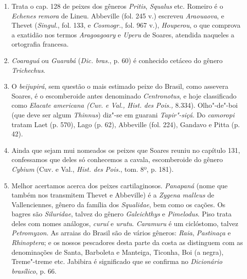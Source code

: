 \begin{enumerate}
\begin{verse}
\textit{Che sotto l'acqua è gente che sospira,\\ 
E fanno pullular quest'acqua al summo.} \\*
\end{verse}
As assaltadas de que se faz menção seriam talvez obra de tubarões ou de jacarés, uma 
vez que por ali não consta haver focas.

\item Trata o cap. 128 de peixes dos gêneros \textit{Pritis}, \textit{Squalus} etc. Romeiro é o \textit{Echenes 
remora} de Lineu. Abbeville (fol. 245 v.) escreveu \textit{Araouaova}, e Thevet (\textit{Singul.}, fol. 
133, e  \textit{Cosmogr.}, fol. 967 v.), \textit{Houperou}, o que comprova a exatidão nos termos \textit{Aragoagoary} 
e \textit{Uperu} de Soares, atendida naqueles a ortografia francesa.

\item \textit{Coaraguá} ou \textit{Guarabá} (\textit{Dic. bras.}, p. 60) é conhecido cetáceo do gênero  \textit{Trichechus}.

\item O \textit{beijupirá}, sem questão o mais estimado peixe do Brasil, como assevera Soares, 
é o escomberoide antes denominado \textit{Centronotus}, e hoje classificado como 
\textit{Elacate americana (Cuv. e Val., Hist. des Pois.,} 8.334).
Olho"-de"-boi (que deve ser algum \textit{Thinnus}) diz"-se em guarani \textit{Tapir"-siçá}. Do \textit{camoropi} 
tratam Laet (p. 570), Lago (p. 62), Abbeville (fol. 224), Gandavo e Pitta (p. 42).

\item  Ainda que sejam mui nomeados os peixes que Soares reuniu no
capítulo 131, confessamos que deles só conhecemos a cavala, escomberoide
do gênero \textit{Cybium} (Cuv. e Val., \textit{Hist. des Pois.}, tom. 8º, p. 181).

\item  Melhor acertamos acerca dos peixes cartilaginosos. \textit{Panapaná}
(nome que também nos transmitem Thevet e Abbeville) é a \textit{Zygena malleus}
de Vallenciennes, gênero da família dos \textit{Squalidae}, bem como os cações. Os
bagres são \textit{Siluridae}, talvez do gênero \textit{Galeichthys} e \textit{Pimelodus}. Piso trata
deles com nomes análogos, \textit{curuí} e \textit{urutu}. \textit{Caramuru} é um ciclóstomo, talvez \textit{Petromyzon}. 
As arraias do Brasil são de vários gêneros: \textit{Raia}, \textit{Pastinaça} e
\textit{Rhinoptera}; e os nossos pescadores desta parte da costa as distinguem com
as denominações de Santa, Barboleta e Manteiga, Ticonha, Boi (a negra),
Treme"-treme etc. Jabibira é significado que se confirma no \textit{Dicionário brasílico}, p. 66.


\end{enumerate}
